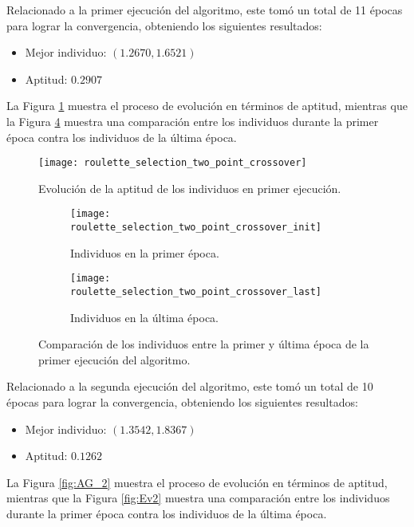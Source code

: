 Relacionado a la primer ejecución del algoritmo, este tomó un total de 11 épocas para lograr la convergencia, obteniendo los siguientes resultados:
\begin{itemize}
	\item Mejor individuo: $(1.2670, 1.6521)$
	\item Aptitud: $0.2907$
\end{itemize}

La Figura \ref{fig:AG_1} muestra el proceso de evolución en términos de aptitud, mientras que la Figura \ref{fig:Ev1} muestra una comparación entre los individuos durante la primer época contra los individuos de la última época.

\begin{figure}[htbp]
	\centering
	\texttt{[image: roulette\_selection\_two\_point\_crossover]}
	\caption{Evolución de la aptitud de los individuos en primer ejecución.}
	\label{fig:AG_1}
\end{figure}

\begin{figure}
     \centering
     \begin{subfigure}[b]{0.45\textwidth}
         \centering
         \texttt{[image: roulette\_selection\_two\_point\_crossover\_init]}
         \caption{Individuos en la primer época.}
         \label{fig:Ev1_i}
     \end{subfigure}
     \hfill
     \begin{subfigure}[b]{0.45\textwidth}
         \centering
         \texttt{[image: roulette\_selection\_two\_point\_crossover\_last]}
         \caption{Individuos en la última época.}
         \label{fig:Ev1_f}
     \end{subfigure}
     \caption{Comparación de los individuos entre la primer y última época de la primer ejecución del algoritmo.}
     \label{fig:Ev1}
\end{figure}

\FloatBarrier
Relacionado a la segunda ejecución del algoritmo, este tomó un total de 10 épocas para lograr la convergencia, obteniendo los siguientes resultados:
\begin{itemize}
	\item Mejor individuo: $(1.3542, 1.8367)$
	\item Aptitud: $0.1262$
\end{itemize}

La Figura \ref{fig:AG_2} muestra el proceso de evolución en términos de aptitud, mientras que la Figura \ref{fig:Ev2} muestra una comparación entre los individuos durante la primer época contra los individuos de la última época.

